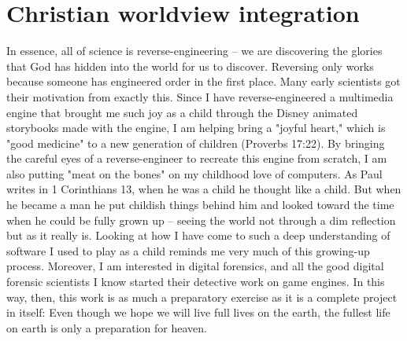 \documentclass{amsart}
\begin{document}
\section{Christian worldview integration}

In essence, all of science is reverse-engineering -- we are discovering the
glories that God has hidden into the world for us to discover. Reversing only
works because someone has engineered order in the first place. Many early
scientists got their motivation from exactly this. Since I have
reverse-engineered a multimedia engine that brought me such joy as a child
through the Disney animated storybooks made with the engine, I am helping bring
a "joyful heart," which is "good medicine" to a new generation of children
(Proverbs 17:22). By bringing the careful eyes of a reverse-engineer to recreate
this engine from scratch, I am also putting "meat on the bones" on my childhood
love of computers. As Paul writes in 1 Corinthians 13, when he was a child he
thought like a child. But when he became a man he put childish things behind him
and looked toward the time when he could be fully grown up -- seeing the world
not through a dim reflection but as it really is. Looking at how I have come to
such a deep understanding of software I used to play as a child reminds me very
much of this growing-up process. Moreover, I am interested in digital forensics,
and all the good digital forensic scientists I know started their detective work
on game engines. In this way, then, this work is as much a preparatory exercise
as it is a complete project in itself: Even though we hope we will live full
lives on the earth, the fullest life on earth is only a preparation for heaven.
\end{document}
